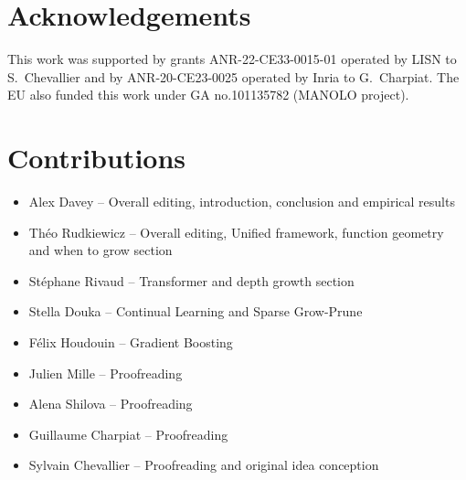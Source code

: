 \section*{Acknowledgements}

This work was supported by grants ANR-22-CE33-0015-01 operated by LISN to S.~Chevallier and by ANR-20-CE23-0025 operated by Inria to G.~Charpiat. 
The EU also funded this work under GA no.101135782 (MANOLO project).

\section*{Contributions}

\begin{itemize}
    \item Alex Davey -- Overall editing, introduction, conclusion and empirical results
    \item Théo Rudkiewicz -- Overall editing, Unified framework, function geometry and when to grow section
    \item Stéphane Rivaud -- Transformer and depth growth section
    \item Stella Douka -- Continual Learning and Sparse Grow-Prune
    \item Félix Houdouin -- Gradient Boosting
    \item Julien Mille -- Proofreading
    \item Alena Shilova -- Proofreading
    \item Guillaume Charpiat -- Proofreading
    \item Sylvain Chevallier -- Proofreading and original idea conception
\end{itemize}
